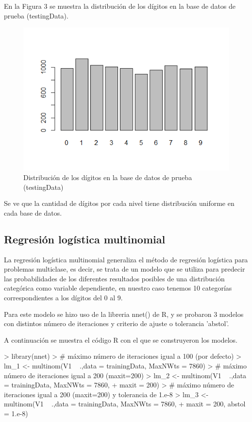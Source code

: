\documentclass{article}
\begin{document}
En la Figura 3 se muestra la distribución de los dígitos en la base de datos de prueba (testingData).

\begin{figure}[H]
    \centering
	\includegraphics{figure/test.png}
	\caption{Distribución de los dígitos en la base de datos de prueba (testingData)}
\end{figure}

Se ve que la cantidad de dígitos por cada nivel tiene distribución uniforme en cada base de datos.



\subsection{Regresión logística multinomial}

La regresión logística multinomial generaliza el método de regresión logística para problemas multiclase, es decir, se trata de un modelo que se utiliza para predecir las probabilidades de los diferentes resultados posibles de una distribución categórica como variable dependiente, en nuestro caso tenemos 10 categorías correspondientes a los dígitos del 0 al 9.

Para este modelo se hizo uso de la libreria nnet() de R, y se probaron 3 modelos con distintos número de iteraciones y criterio de ajuste o tolerancia 'abstol'.

A continuación se muestra el código R con el que se construyeron los modelos. 

\begin{Schunk}
\begin{Sinput}
> library(nnet)
> # máximo número de iteraciones igual a 100 (por defecto)
> lm_1 <- multinom(V1 ~ .,data = trainingData, MaxNWts = 7860)
> # máximo número de iteraciones igual a 200 (maxit=200)
> lm_2 <- multinom(V1 ~ .,data = trainingData, MaxNWts = 7860, 
+                 maxit = 200)
> # máximo número de iteraciones igual a 200 (maxit=200) y tolerancia de 1.e-8
> lm_3 <- multinom(V1 ~ .,data = trainingData, MaxNWts = 7860,
+                 maxit = 200, abstol = 1.e-8)
\end{Sinput}
\end{Schunk}
\end{document}
